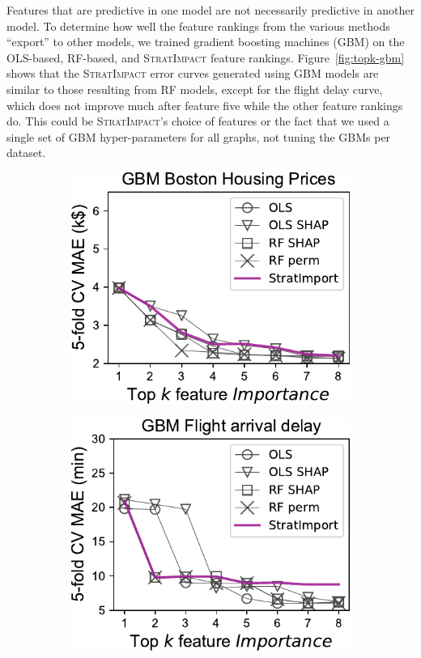 \documentclass[11pt]{article}
\newcommand{\figref}[1]{Figure~\ref{#1}}
\newcommand{\simp}{\fontfamily{cmr}\textsc{\small StratImpact}}
\begin{document}
Features that are predictive in one model are not necessarily predictive in another model.  To determine how well the feature rankings from the various methods ``export'' to other models, we trained gradient boosting machines (GBM) on the OLS-based, RF-based, and \simp{} feature rankings. \figref{fig:topk-gbm} shows that the \simp{} error curves generated using GBM models are similar to those resulting from RF models, except for the flight delay curve, which does not improve much after feature five while the other feature rankings do.  This could be \simp's choice of features or the fact that we used a single set of GBM hyper-parameters for all graphs, not tuning the GBMs per dataset. 

\begin{figure}
\centering
\begin{subfigure}{.245\textwidth}
    \centering
\includegraphics[scale=0.45]{images/boston-topk-GBM-Importance.pdf}
\subcaption{}
\end{subfigure}%
\hfill
\begin{subfigure}{.245\textwidth}
    \centering
\includegraphics[scale=0.45]{images/flights-topk-GBM-Importance.pdf}

\end{subfigure}
\end{figure}
\end{document}
